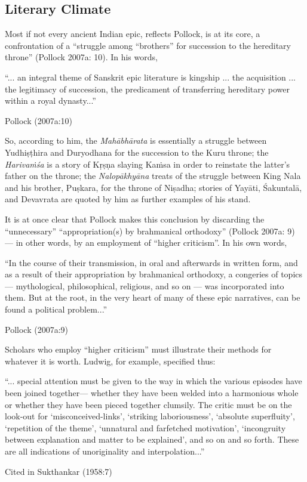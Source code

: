 \subsection{Literary Climate}\label{sec1.1.1}

Most if not every ancient Indian epic, reflects Pollock, is at its core, a confrontation of a “struggle among “brothers” for succession to the hereditary throne” (Pollock 2007a: 10).  In his words, 

\begin{myquote}
“... an integral theme of Sanskrit epic literature is kingship ... the acquisition ... the legitimacy of succession, the predicament of transferring hereditary power within a royal dynasty...”

\hfill Pollock (2007a:10)
\end{myquote}

So, according to him, the {\sl Mahābhārata} is essentially a struggle between Yudhiṣṭhira and Duryodhana for the succession to the Kuru throne; the {\sl Harivaṁśa} is a story of Kṛṣṇa slaying Kaṁsa in order to reinstate the latter’s father on the throne; the {\sl Nalopākhyāna} treats of the struggle between King Nala and his brother, Puṣkara, for the throne of Niṣadha; stories of Yayāti, Śakuntalā, and Devavrata are quoted by him as further examples of his stand. 

It is at once clear that Pollock makes this conclusion by discarding the “unnecessary” “appropriation(s) by brahmanical orthodoxy” (Pollock 2007a: 9) --- in other words, by an employment of “higher criticism”. In his own words, 

\begin{myquote}
“In the course of their transmission, in oral and afterwards in written form, and as a result of their appropriation by brahmanical orthodoxy, a congeries of topics --- mythological, philosophical, religious, and so on --- was incorporated into them. But at the root, in the very heart of many of these epic narratives, can be found a political problem...”	

\hfill Pollock (2007a:9)
\end{myquote}

Scholars who employ “higher criticism” must illustrate their methods for whatever it is worth. Ludwig, for example, specified thus:

\begin{myquote}
“... special attention must be given to the way in which the various episodes have been joined together— whether they have been welded into a harmonious whole or whether they have been pieced together clumsily. The critic must be on the look-out for ‘misconceived-links’, ‘striking laboriousness’, ‘absolute superfluity’, ‘repetition of the theme’, ‘unnatural and farfetched motivation’, ‘incongruity between explanation and matter to be explained’, and so on and so forth. These are all indications of unoriginality and interpolation...”	

\hfill Cited in Sukthankar (1958:7)
\end{myquote}

